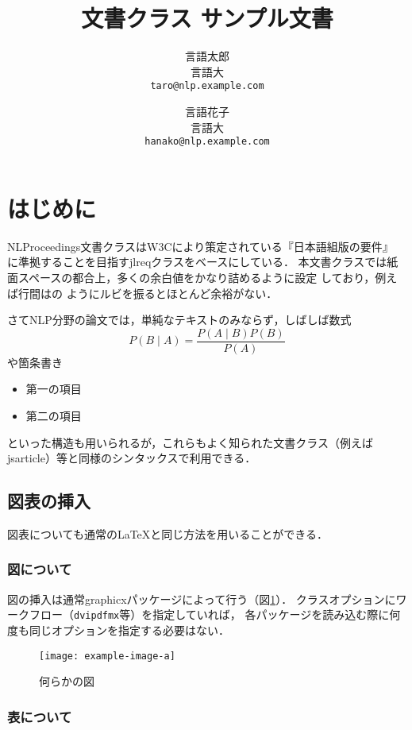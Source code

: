 \documentclass[
  platex, dvipdfmx,  %
]{nlproceedings}
\title{\pkg{NLProceedings}文書クラス サンプル文書}
\author{%
  言語太郎 \\ 言語大 \\ \texttt{taro@nlp.example.com}\and
  言語花子 \\ 言語大 \\ \texttt{hanako@nlp.example.com}}
\newcommand{\pkg}[1]{\textsf{#1}}
\newcommand{\code}[1]{\texttt{#1}}
\begin{document}
\maketitle

\section{はじめに}

\pkg{NLProceedings}文書クラスはW3Cにより策定されている『日本語組版の要件』%
\cite{JLREQ}に準拠することを目指す\pkg{jlreq}クラスをベースにしている．
本文書クラスでは紙面スペースの都合上，多くの余白値をかなり詰めるように設定
しており，例えば行間はの
ようにルビを振るとほとんど余裕がない．

さてNLP分野の論文では，単純なテキストのみならず，しばしば数式
%
\begin{equation}
P(B\mid A) = \frac{P(A\mid B)P(B)}{P(A)}
\end{equation}
%
や箇条書き
%
\begin{itemize}
\item 第一の項目
\item 第二の項目
\end{itemize}
%
といった構造も用いられるが，これらもよく知られた文書クラス（例えば
\pkg{jsarticle}）等と同様のシンタックスで利用できる．

\subsection{図表の挿入}

図表についても通常の\LaTeX と同じ方法を用いることができる．

\subsubsection{図について}

図の挿入は通常\pkg{graphicx}パッケージによって行う（図\ref{fig:sample}）．
クラスオプションにワークフロー（\code{dvipdfmx}等）を指定していれば，
各パッケージを読み込む際に何度も同じオプションを指定する必要はない．
%
\begin{figure}[h]
\centering
\texttt{[image: example-image-a]}
\caption{何らかの図}
\label{fig:sample}
\end{figure}

\subsubsection{表について}
\end{document}
